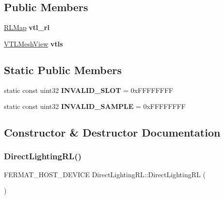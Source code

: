\subsection*{Public Members}
\begin{DoxyCompactItemize}
\item 
\mbox{\label{struct_direct_lighting_r_l_aa31be9d85eff9d49eb817add17697424}} 
\hyperlink{struct_adaptive_clustered_r_l_view}{R\+L\+Map} {\bfseries vtl\+\_\+rl}
\item 
\mbox{\label{struct_direct_lighting_r_l_a6bcbd1f1e5700263520ac1ef58d6c58b}} 
\hyperlink{struct_v_t_l_mesh_view}{V\+T\+L\+Mesh\+View} {\bfseries vtls}
\end{DoxyCompactItemize}
\subsection*{Static Public Members}
\begin{DoxyCompactItemize}
\item 
\mbox{\label{struct_direct_lighting_r_l_ae41b8ae138581a431ef9e7ea7acf732b}} 
static const uint32 {\bfseries I\+N\+V\+A\+L\+I\+D\+\_\+\+S\+L\+OT} = 0x\+F\+F\+F\+F\+F\+F\+FF
\item 
\mbox{\label{struct_direct_lighting_r_l_aa30959c932994ba2cc0f47f3efd5c1d9}} 
static const uint32 {\bfseries I\+N\+V\+A\+L\+I\+D\+\_\+\+S\+A\+M\+P\+LE} = 0x\+F\+F\+F\+F\+F\+F\+FF
\end{DoxyCompactItemize}


\subsection{Constructor \& Destructor Documentation}
\mbox{\label{struct_direct_lighting_r_l_a4ffd83e2326fa69465a1f474ad7b9a82}} 
\subsubsection{\texorpdfstring{Direct\+Lighting\+R\+L()}{DirectLightingRL()}\hspace{0.1cm}{\footnotesize\ttfamily [1/2]}}
{\footnotesize\ttfamily F\+E\+R\+M\+A\+T\+\_\+\+H\+O\+S\+T\+\_\+\+D\+E\+V\+I\+CE Direct\+Lighting\+R\+L\+::\+Direct\+Lighting\+RL (\begin{DoxyParamCaption}{ }\end{DoxyParamCaption})\hspace{0.3cm}{\ttfamily [inline]}}

